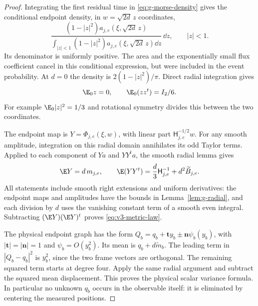 \begin{proof}
Integrating the first residual time in \eqref{eq:g-morse-density} gives
the conditional endpoint density, in $w=\sqrt{2d}\,z$ coordinates,
\[
 \frac{(1-|z|^2)a_{j,e}(\xi,\sqrt{2d}\,z)}
 {\int_{|z|<1}(1-|z|^2)a_{j,e}(\xi,\sqrt{2d}\,z)\dd z}\,\dd z,
 \qquad |z|<1.
\]
Its denominator is uniformly positive. The area and the exponentially
small flux coefficient cancel in this conditional expression, but
were included in the event probability. At $d=0$ the density is
$2(1-|z|^2)/\pi$. Direct radial integration gives
\begin{equation}\label{eq:v3-disk-moments}
 \E_0 z=0,\qquad \E_0(zz^t)=I_2/6.
\end{equation}
For example $\E_0|z|^2=1/3$ and rotational symmetry divides this
between the two coordinates.

The endpoint map is $Y=\Phi_{j,e}(\xi,w)$, with linear part
$\mathsf H_{j,e}^{-1/2}w$. For any smooth amplitude, integration
on this radial domain annihilates its odd Taylor terms. Applied to
each component of $Y a$ and $YY^t a$, the smooth radial lemma gives
\[
 \E Y=d\,m_{j,e},\qquad
 \E(YY^t)=\frac d3\mathsf H_{j,e}^{-1}+d^2\widetilde B_{j,e}.
\]
All statements include smooth right extensions and uniform derivatives:
the endpoint maps and amplitudes have the bounds in
Lemma~\ref{lem:g-radial}, and each division by $d$ uses the
vanishing constant term of a smooth even integral. Subtracting
$(\E Y)(\E Y)^t$ proves \eqref{eq:v3-metric-law}.

The physical endpoint graph has the form
$Q_b=q_b+\mathbf t y_b\pm\mathbf n\psi_b(y_b)$, with
$|\mathbf t|=|\mathbf n|=1$ and $\psi_b=O(y_b^2)$.
Its mean is $q_b+d\widetilde m_b$. The leading term in
$|Q_b-q_b|^2$ is $y_b^2$, since the two frame vectors are orthogonal.
The remaining squared term starts at degree four. Apply the same
radial argument and subtract the squared mean displacement.
This proves the physical scalar variance formula. In particular no
unknown $q_b$ occurs in the observable itself: it is eliminated by
centering the measured positions.
\end{proof}

